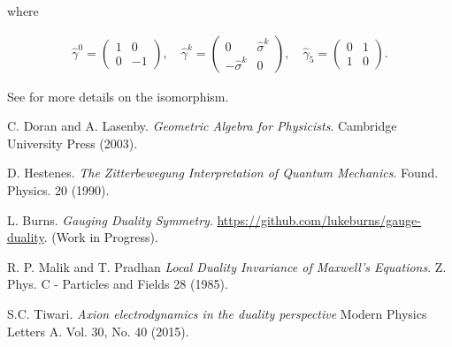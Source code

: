 \documentclass{article}
\begin{document}
  where

  \begin{align}
    \hat \gamma^0 = \begin{pmatrix} 1 & 0 \\ 0 & -1 \end{pmatrix},\quad \hat \gamma^k = \begin{pmatrix} 0 & \hat \sigma^k \\ -\hat \sigma^k & 0 \end{pmatrix},\quad \hat \gamma_5 = \begin{pmatrix} 0 & 1 \\ 1 & 0 \end{pmatrix}.
  \end{align}

  See \cite{gap} for more details on the isomorphism.

  \begin{thebibliography}{9}
      C. Doran and A. Lasenby.
      \emph{Geometric Algebra for Physicists}. Cambridge University Press (2003).

      D. Hestenes.
      \emph{The Zitterbewegung Interpretation of Quantum Mechanics}.
      Found. Physics. 20 (1990).

      L. Burns.
      \emph{Gauging Duality Symmetry}.
      \url{https://github.com/lukeburns/gauge-duality}. (Work in Progress).

      R. P. Malik and T. Pradhan 
      \emph{Local Duality Invariance of Maxwell's Equations}.
      Z. Phys. C - Particles and Fields 28 (1985).

      S.C. Tiwari.
      \emph{Axion electrodynamics in the duality perspective}
      Modern Physics Letters A.
      Vol. 30, No. 40 (2015).

  \end{thebibliography}
\end{document}
